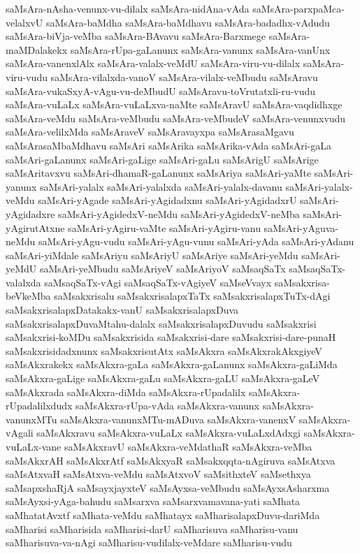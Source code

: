 {saMsAra-nAsha-venunx-vu-dilalx
saMsAra-nidAna-vAda
saMsAra-parxpaMca-velalxvU
saMsAra-baMdha
saMsAra-baMdhavu
saMsAra-badadhx-vAdudu
saMsAra-biVja-veMba
saMsAra-BAvavu
saMsAra-Barxmege
saMsAra-maMDalakekx
saMsAra-rUpa-gaLanunx
saMsAra-vanunx
saMsAra-vanUnx
saMsAra-vanenxlAlx
saMsAra-valalx-veMdU
saMsAra-viru-vu-dilalx
saMsAra-viru-vudu
saMsAra-vilalxda-vanoV
saMsAra-vilalx-veMbudu
saMsAravu
saMsAra-vukaSxyA-vAgu-vu-deMbudU
saMsAravu-toVrutatxli-ru-vudu
saMsAra-vuLaLx
saMsAra-vuLaLxva-naMte
saMsAravU
saMsAra-vaqdidhxge
saMsAra-veMdu
saMsAra-veMbudu
saMsAra-veMbudeV
saMsAra-venunxvudu
saMsAra-velilxMda
saMsAraveV
saMsAravayxpa
saMsArasaMgavu
saMsArasaMbaMdhavu
saMsAri
saMsArika
saMsArika-vAda
saMsAri-gaLa
saMsAri-gaLanunx
saMsAri-gaLige
saMsAri-gaLu
saMsArigU
saMsArige
saMsAritavxvu
saMsAri-dhamaR-gaLanunx
saMsAriya
saMsAri-yaMte
saMsAri-yanunx
saMsAri-yalalx
saMsAri-yalalxda
saMsAri-yalalx-davanu
saMsAri-yalalx-veMdu
saMsAri-yAgade
saMsAri-yAgidadxnu
saMsAri-yAgidadxrU
saMsAri-yAgidadxre
saMsAri-yAgidedxV-neMdu
saMsAri-yAgidedxV-neMba
saMsAri-yAgirutAtxne
saMsAri-yAgiru-vaMte
saMsAri-yAgiru-vanu
saMsAri-yAguva-neMdu
saMsAri-yAgu-vudu
saMsAri-yAgu-vunu
saMsAri-yAda
saMsAri-yAdanu
saMsAri-yiMdale
saMsAriyu
saMsAriyU
saMsAriye
saMsAri-yeMdu
saMsAri-yeMdU
saMsAri-yeMbudu
saMsAriyeV
saMsAriyoV
saMsaqSaTx
saMsaqSaTx-valalxda
saMsaqSaTx-vAgi
saMsaqSaTx-vAgiyeV
saMseVvayx
saMsakxrisa-beVkeMba
saMsakxrisalu
saMsakxrisalapxTaTx
saMsakxrisalapxTuTx-dAgi
saMsakxrisalapxDatakakx-vanU
saMsakxrisalapxDuva
saMsakxrisalapxDuvaMtahu-dalalx
saMsakxrisalapxDuvudu
saMsakxrisi
saMsakxrisi-koMDu
saMsakxrisida
saMsakxrisi-dare
saMsakxrisi-dare-punaH
saMsakxrisidadxnunx
saMsakxrisutAtx
saMsAkxra
saMsAkxrakAkxgiyeV
saMsAkxrakekx
saMsAkxra-gaLa
saMsAkxra-gaLanunx
saMsAkxra-gaLiMda
saMsAkxra-gaLige
saMsAkxra-gaLu
saMsAkxra-gaLU
saMsAkxra-gaLeV
saMsAkxrada
saMsAkxra-diMda
saMsAkxra-rUpadalilx
saMsAkxra-rUpadalilxdudx
saMsAkxra-rUpa-vAda
saMsAkxra-vanunx
saMsAkxra-vanunxMTu
saMsAkxra-vanunxMTu-mADuva
saMsAkxra-vanenxV
saMsAkxra-vAgali
saMsAkxravu
saMsAkxra-vuLaLx
saMsAkxra-vuLaLxdAdxgi
saMsAkxra-vuLaLx-vane
saMsAkxravU
saMsAkxra-veMdathaR
saMsAkxra-veMba
saMsAkxrAH
saMsAkxrAtf
saMsAkxyaR
saMsakxqqta-nAgiruva
saMsAtxva
saMsAtxvaH
saMsAtxva-veMdu
saMsAtxvoV
saMsithxteV
saMsethxya
saMsapxshaRjA
saMsayxjayxteV
saMsAyxsa-veMbudu
saMsAyxsAsharxma
saMsAyxsi-yAga-bahudu
saMsarxva
saMsarxvamavana-yati
saMhata
saMhatatAvxtf
saMhata-veMdu
saMhatayx
saMharisalapxDuvu-dariMda
saMharisi
saMharisida
saMharisi-darU
saMharisuva
saMharisu-vanu
saMharisuva-va-nAgi
saMharisu-vudilalx-veMdare
saMharisu-vudu
}
